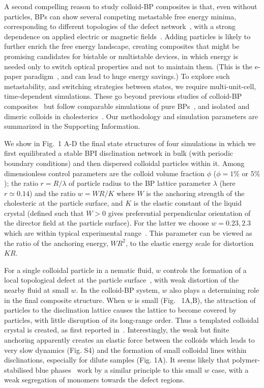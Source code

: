 \documentclass[12pt]{article}
\begin{document}
A second compelling reason to study colloid-BP composites is that, even without particles, BPs can show several competing metastable free energy minima,
corresponding to different topologies of the defect network~\cite{adriano}, with a strong dependence on applied electric or magnetic fields~\cite{henrichfield}.
% 
Adding particles is likely to further enrich the free energy landscape, creating composites that might be promising candidates for bistable or multistable devices, in which energy is needed only to switch optical properties and not to maintain them. (This is the e-paper paradigm~\cite{epaper}, and can lead to huge energy savings.)
To explore such metastability, and switching strategies between states, we require multi-unit-cell, time-dependent simulations. These go beyond previous studies of colloid-BP composites~\cite{miha} but follow comparable simulations of pure BPs~\cite{bp3,henrichfield,domaingrowth}, and isolated and dimeric colloids in cholesterics~\cite{juho1,juho2}. Our methodology and simulation parameters are summarized in the Supporting Information.

We show in Fig.~1 A-D the final state structures of four simulations in which we first equilibrated a stable BPI disclination network in bulk (with periodic boundary conditions) and then dispersed colloidal particles within it. Among dimensionless control parameters are the colloid volume fraction $\phi$  ($\phi = 1\%$ or $5\%$); the ratio $r = R/\lambda$ of particle radius to the BP lattice parameter $\lambda$ (here $r\simeq 0.14$) and the ratio $w = WR/K$ where $W$ is the anchoring strength of the cholesteric at the particle surface, and $K$ is the elastic constant of the liquid crystal (defined such that $W>0$ gives preferential perpendicular orientation of the director field at the particle surface). For the latter we choose $w = 0.23, 2.3$ which are within typical experimental range~\cite{tiffany}. This parameter can be viewed as the ratio of the anchoring energy, $WR^2$, to the elastic energy scale for distortion $KR$. 

For a single colloidal particle in a nematic fluid, $w$ controls the formation of a local topological defect at the particle surface~\cite{stark}, with weak distortion of the nearby fluid at small $w$. In the colloid-BP system, $w$ also plays a determining role in the final composite structure. When $w$ is small (Fig.~ 1A,B), the attraction of particles to the disclination lattice causes
 the lattice to become covered by particles, with little disruption of its
 long-range order. Thus a templated colloidal crystal is created, as first reported in~\cite{miha}. Interestingly, the weak but finite anchoring apparently creates an elastic force between the colloids which leads to very slow dynamics (Fig. S4) and the formation of small colloidal lines within disclinations, especially for dilute samples (Fig. 1A). It seems likely that polymer-stabilised  blue phases~\cite{kikuchi} work by a similar principle to this small $w$ case, with a weak segregation of monomers towards the defect regions.
\end{document}
